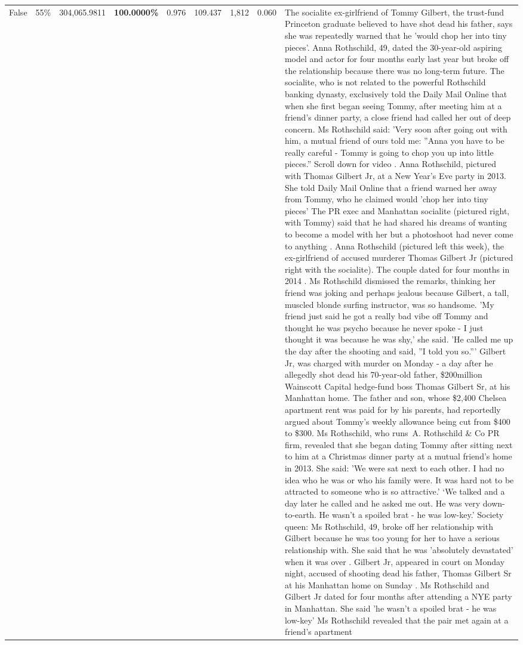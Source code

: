 \begin{table}[H]
\begin{tabular}{lllrlllll}
False & 55\% & \color{red} 304,065.9811 & \bfseries \color{red} 100.0000\% & 0.976 & 109.437 & 1,812 & 0.060 & The socialite ex-girlfriend of Tommy Gilbert, the trust-fund Princeton graduate believed to have shot dead his father, says she was repeatedly warned that he 'would chop her into tiny pieces'. Anna Rothschild, 49, dated the 30-year-old aspiring model and actor for four months early last year but broke off the relationship because there was no long-term future. The socialite, who is not related to the powerful Rothschild banking dynasty, exclusively told the Daily Mail Online that when she first began seeing Tommy, after meeting him at a friend's dinner party, a close friend had called her out of deep concern. Ms Rothschild said: 'Very soon after going out with him, a mutual friend of ours told me: ''Anna you have to be really careful - Tommy is going to chop you up into little pieces.'' Scroll down for video . Anna Rothschild, pictured with Thomas Gilbert Jr, at a New Year's Eve party in 2013. She told Daily Mail Online that a friend warned her away from Tommy, who he claimed would 'chop her into tiny pieces' The PR exec and Manhattan socialite (pictured right, with Tommy) said that he had shared his dreams of wanting to become a model with her but a photoshoot had never come to anything . Anna Rothschild (pictured left this week), the ex-girlfriend of accused murderer Thomas Gilbert Jr (pictured right with the socialite). The couple dated for four months in 2014 . Ms Rothschild dismissed the remarks, thinking her friend was joking and perhaps jealous because Gilbert, a tall, muscled blonde surfing instructor, was so handsome. 'My friend just said he got a really bad vibe off Tommy and thought he was psycho because he never spoke - I just thought it was because he was shy,' she said. 'He called me up the day after the shooting and said, ''I told you so.''' Gilbert Jr, was charged with murder on Monday - a day after he allegedly shot dead his 70-year-old father, \$200million Wainscott Capital hedge-fund boss Thomas Gilbert Sr, at his Manhattan home. The father and son, whose \$2,400 Chelsea apartment rent was paid for by his parents, had reportedly argued about Tommy's weekly allowance being cut from \$400 to \$300. Ms Rothschild, who runs A. Rothschild \& Co PR firm, revealed that she began dating Tommy after sitting next to him at a Christmas dinner party at a mutual friend's home in 2013. She said: 'We were sat next to each other. I had no idea who he was or who his family were. It was hard not to be attracted to someone who is so attractive.' ‘We talked and a day later he called and he asked me out. He was very down-to-earth. He wasn’t a spoiled brat - he was low-key.’ Society queen: Ms Rothschild, 49, broke off her relationship with Gilbert because he was too young for her to have a serious relationship with. She said that he was 'absolutely devastated' when it was over . Gilbert Jr, appeared in court on Monday night, accused of shooting dead his father, Thomas Gilbert Sr at his Manhattan home on Sunday . Ms Rothschild and Gilbert Jr dated for four months after attending a NYE party in Manhattan. She said 'he wasn't a spoiled brat - he was low-key' Ms Rothschild revealed that the pair met again at a friend’s apartment 
\end{tabular}
\end{table}
